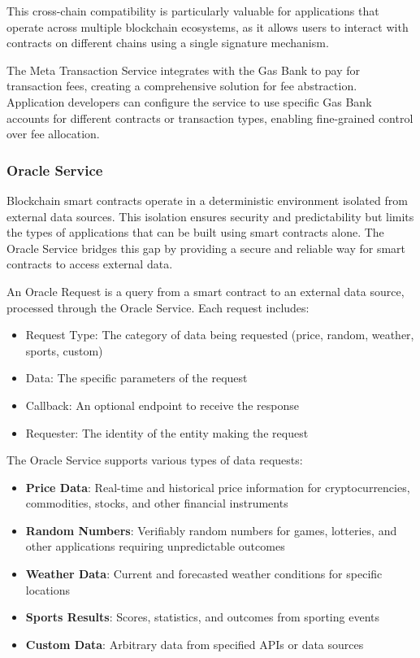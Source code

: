 This cross-chain compatibility is particularly valuable for applications that operate across multiple blockchain ecosystems, as it allows users to interact with contracts on different chains using a single signature mechanism.

The Meta Transaction Service integrates with the Gas Bank to pay for transaction fees, creating a comprehensive solution for fee abstraction. Application developers can configure the service to use specific Gas Bank accounts for different contracts or transaction types, enabling fine-grained control over fee allocation.

\subsubsection{Oracle Service}
\label{subsubsec:oracle}

Blockchain smart contracts operate in a deterministic environment isolated from external data sources. This isolation ensures security and predictability but limits the types of applications that can be built using smart contracts alone. The Oracle Service bridges this gap by providing a secure and reliable way for smart contracts to access external data.



\begin{definition}
An Oracle Request is a query from a smart contract to an external data source, processed through the Oracle Service. Each request includes:
\begin{itemize}
    \item Request Type: The category of data being requested (price, random, weather, sports, custom)
    \item Data: The specific parameters of the request
    \item Callback: An optional endpoint to receive the response
    \item Requester: The identity of the entity making the request
\end{itemize}
\end{definition}

The Oracle Service supports various types of data requests:

\begin{itemize}
    \item \textbf{Price Data}: Real-time and historical price information for cryptocurrencies, commodities, stocks, and other financial instruments
    \item \textbf{Random Numbers}: Verifiably random numbers for games, lotteries, and other applications requiring unpredictable outcomes
    \item \textbf{Weather Data}: Current and forecasted weather conditions for specific locations
    \item \textbf{Sports Results}: Scores, statistics, and outcomes from sporting events
    \item \textbf{Custom Data}: Arbitrary data from specified APIs or data sources
\end{itemize}

